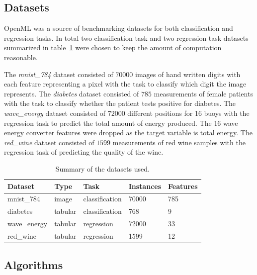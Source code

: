 \subsection{Datasets}


OpenML \parencite{vanschorenOpenMLNetworkedScience2014} was a source of benchmarking datasets for both classification \parencite{bischlOpenMLBenchmarkingSuites2017} and regression \parencite{fischerOpenMLCTR23CuratedTabular2023} tasks. In total two classification task and two regression task datasets summarized in table~\ref{table:datasets} were chosen to keep the amount of computation reasonable.

The \emph{mnist\_784} dataset consisted of $70000$ images of hand written digits with each feature representing a pixel with the task to classify which digit the image represents. The \emph{diabetes} dataset consisted of $785$ measurements of female patients with the task to classify whether the patient tests positive for diabetes. The \emph{wave\_energy} dataset consisted of $72000$ different positions for 16 buoys with the regression task to predict the total amount of energy produced. The $16$ wave energy converter features were dropped as the target variable is total energy. The \emph{red\_wine} dataset consisted of $1599$ measurements of red wine samples with the regression task of predicting the quality of the wine.

\begin{table}[h]
    \centering
    \begin{tabular}{lllll}
        \toprule
        Dataset      & Type    & Task           & Instances & Features \\
        \midrule
        mnist\_784   & image   & classification & 70000     & 785      \\
        diabetes     & tabular & classification & 768       & 9        \\
        wave\_energy & tabular & regression     & 72000     & 33       \\
        red\_wine    & tabular & regression     & 1599      & 12       \\
        \bottomrule
    \end{tabular}
    \caption{Summary of the datasets used.}
    \label{table:datasets}
\end{table}

\subsection{Algorithms}


